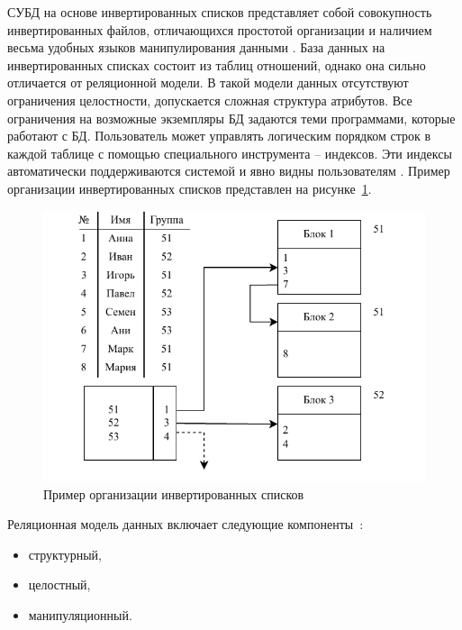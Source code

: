 СУБД на основе инвертированных списков представляет собой совокупность инвертированных файлов, отличающихся простотой организации и наличием весьма удобных языков манипулирования данными \cite{guschin-db-2015}.
База данных на инвертированных списках состоит из таблиц отношений, однако она сильно отличается от реляционной модели. 
В такой модели данных отсутствуют ограничения целостности, допускается сложная структура атрибутов. 
Все ограничения на возможные экземпляры БД задаются теми программами, которые работают с БД. 
Пользователь может управлять логическим порядком строк в каждой таблице с помощью специального инструмента -- индексов. 
Эти индексы автоматически поддерживаются системой и явно видны пользователям \cite{avrunev-db-models-2018}. Пример организации инвертированных списков представлен на рисунке~\ref{invert}.

\begin{figure}[ht]
	\centering
	\includegraphics[scale=1.4]{img/invert.pdf}
	\caption{Пример организации инвертированных списков}
	\label{invert}
\end{figure}\pagebreak

Реляционная модель данных включает следующие компоненты~\cite{avrunev-db-models-2018}:

\begin{itemize}[label=---]
	\item структурный,
	
	\item целостный,
	
	\item манипуляционный.
\end{itemize}

